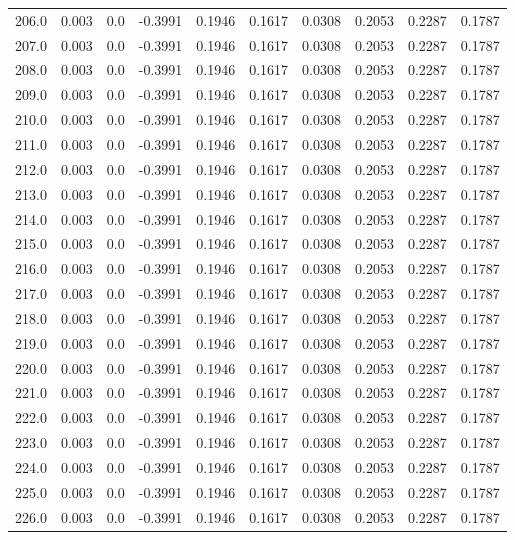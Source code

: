 \begin{longtable}{lrrrrrrrrr}
206.0 & 0.003 & 0.0 & -0.3991 & 0.1946 & 0.1617 & 0.0308 & 0.2053 & 0.2287 & 0.1787 \\
207.0 & 0.003 & 0.0 & -0.3991 & 0.1946 & 0.1617 & 0.0308 & 0.2053 & 0.2287 & 0.1787 \\
208.0 & 0.003 & 0.0 & -0.3991 & 0.1946 & 0.1617 & 0.0308 & 0.2053 & 0.2287 & 0.1787 \\
209.0 & 0.003 & 0.0 & -0.3991 & 0.1946 & 0.1617 & 0.0308 & 0.2053 & 0.2287 & 0.1787 \\
210.0 & 0.003 & 0.0 & -0.3991 & 0.1946 & 0.1617 & 0.0308 & 0.2053 & 0.2287 & 0.1787 \\
211.0 & 0.003 & 0.0 & -0.3991 & 0.1946 & 0.1617 & 0.0308 & 0.2053 & 0.2287 & 0.1787 \\
212.0 & 0.003 & 0.0 & -0.3991 & 0.1946 & 0.1617 & 0.0308 & 0.2053 & 0.2287 & 0.1787 \\
213.0 & 0.003 & 0.0 & -0.3991 & 0.1946 & 0.1617 & 0.0308 & 0.2053 & 0.2287 & 0.1787 \\
214.0 & 0.003 & 0.0 & -0.3991 & 0.1946 & 0.1617 & 0.0308 & 0.2053 & 0.2287 & 0.1787 \\
215.0 & 0.003 & 0.0 & -0.3991 & 0.1946 & 0.1617 & 0.0308 & 0.2053 & 0.2287 & 0.1787 \\
216.0 & 0.003 & 0.0 & -0.3991 & 0.1946 & 0.1617 & 0.0308 & 0.2053 & 0.2287 & 0.1787 \\
217.0 & 0.003 & 0.0 & -0.3991 & 0.1946 & 0.1617 & 0.0308 & 0.2053 & 0.2287 & 0.1787 \\
218.0 & 0.003 & 0.0 & -0.3991 & 0.1946 & 0.1617 & 0.0308 & 0.2053 & 0.2287 & 0.1787 \\
219.0 & 0.003 & 0.0 & -0.3991 & 0.1946 & 0.1617 & 0.0308 & 0.2053 & 0.2287 & 0.1787 \\
220.0 & 0.003 & 0.0 & -0.3991 & 0.1946 & 0.1617 & 0.0308 & 0.2053 & 0.2287 & 0.1787 \\
221.0 & 0.003 & 0.0 & -0.3991 & 0.1946 & 0.1617 & 0.0308 & 0.2053 & 0.2287 & 0.1787 \\
222.0 & 0.003 & 0.0 & -0.3991 & 0.1946 & 0.1617 & 0.0308 & 0.2053 & 0.2287 & 0.1787 \\
223.0 & 0.003 & 0.0 & -0.3991 & 0.1946 & 0.1617 & 0.0308 & 0.2053 & 0.2287 & 0.1787 \\
224.0 & 0.003 & 0.0 & -0.3991 & 0.1946 & 0.1617 & 0.0308 & 0.2053 & 0.2287 & 0.1787 \\
225.0 & 0.003 & 0.0 & -0.3991 & 0.1946 & 0.1617 & 0.0308 & 0.2053 & 0.2287 & 0.1787 \\
226.0 & 0.003 & 0.0 & -0.3991 & 0.1946 & 0.1617 & 0.0308 & 0.2053 & 0.2287 & 0.1787 \\

\end{longtable}

